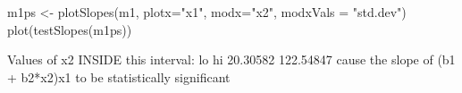 \begin{Schunk}
\begin{Sinput}
 m1ps <- plotSlopes(m1, plotx="x1", modx="x2", modxVals = "std.dev")
 plot(testSlopes(m1ps))
\end{Sinput}
\begin{Soutput}
Values of x2 INSIDE this interval:
       lo        hi 
 20.30582 122.54847 
cause the slope of (b1 + b2*x2)x1 to be statistically significant
\end{Soutput}
\end{Schunk}
